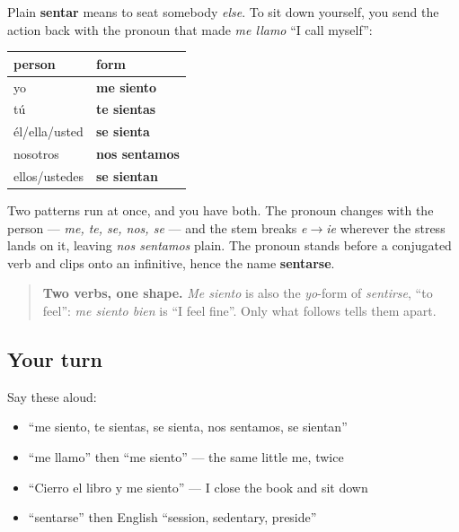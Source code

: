 \begin{grammarlens}[title={Grammar Lens: seating someone, and seating yourself}]
Plain \textbf{sentar} means to seat somebody \emph{else}. To sit down yourself, you send the action back with the pronoun that made \emph{me llamo} \textquotedblleft{}I call myself\textquotedblright{}:

\noindent
\begin{tabularx}{\linewidth}{@{}>{\raggedright\arraybackslash}X>{\raggedright\arraybackslash}X@{}}
\toprule
\textbf{person} & \textbf{form} \\
\midrule
yo & \textbf{me siento} \\
tú & \textbf{te sientas} \\
él/ella/usted & \textbf{se sienta} \\
nosotros & \textbf{nos sentamos} \\
ellos/ustedes & \textbf{se sientan} \\
\bottomrule
\end{tabularx}

Two patterns run at once, and you have both. The pronoun changes with the person — \emph{me, te, se, nos, se} — and the stem breaks \emph{e$\to$ie} wherever the stress lands on it, leaving \emph{nos sentamos} plain. The pronoun stands before a conjugated verb and clips onto an infinitive, hence the name \textbf{sentarse}.

\begin{quote}
\textbf{Two verbs, one shape.} \emph{Me siento} is also the \emph{yo}-form of \emph{sentirse}, \textquotedblleft{}to feel\textquotedblright{}: \emph{me siento bien} is \textquotedblleft{}I feel fine\textquotedblright{}. Only what follows tells them apart.
\end{quote}
\end{grammarlens}

\subsection*{Your turn}
Say these aloud:

\begin{itemize}
\raggedright
  \item \textquotedblleft{}me siento, te sientas, se sienta, nos sentamos, se sientan\textquotedblright{}
  \item \textquotedblleft{}me llamo\textquotedblright{} then \textquotedblleft{}me siento\textquotedblright{} — the same little me, twice
  \item \textquotedblleft{}Cierro el libro y me siento\textquotedblright{} — I close the book and sit down
  \item \textquotedblleft{}sentarse\textquotedblright{} then English \textquotedblleft{}session, sedentary, preside\textquotedblright{}
\end{itemize}


